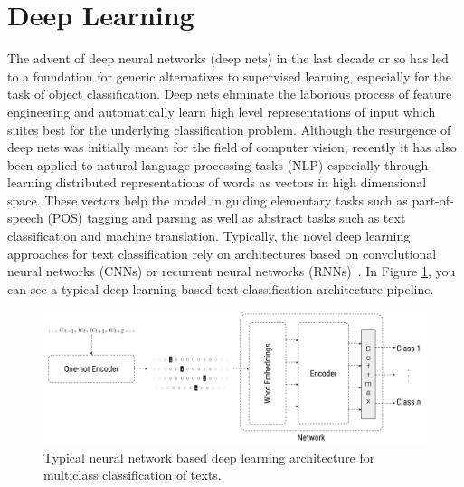 \section{Deep Learning}
The advent of deep neural networks (deep nets) in the last decade or so has led to a foundation for generic alternatives to supervised learning, especially for the task of object classification. Deep nets eliminate the laborious process of feature engineering and automatically learn high level representations of input which suites best for the underlying classification problem. Although the resurgence of deep nets was initially meant for the field of computer vision, recently it has also been applied to natural language processing tasks (NLP)\cite{bengio2003neural, collobert2008unified, mikolov2013distributed} especially through learning distributed representations of words as vectors in high dimensional space. These vectors help the model in guiding elementary tasks such as part-of-speech (POS) tagging and parsing as well as abstract tasks such as text classification and machine translation. Typically, the novel deep learning approaches for text classification rely on architectures based on convolutional neural networks (CNNs) or recurrent neural networks (RNNs)~\cite{young2018recent}. In Figure \ref{fig:dlarch}, you can see a typical deep learning based text classification architecture pipeline.





\begin{figure}[!htb]
    \includegraphics[width=1\textwidth, center]{Figures/text-classification-diagram.png}
    \caption{Typical neural network based deep learning architecture for multiclass classification of texts.}
    \label{fig:dlarch}
\end{figure}


